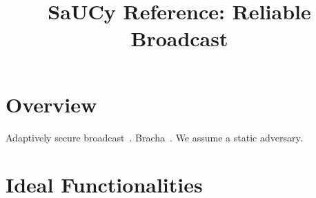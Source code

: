 \documentclass{llncs}
\title{SaUCy Reference: Reliable Broadcast}
\author{}
\institute{}
\begin{document}
\maketitle

\section{Overview}

Adaptively secure
broadcast~\cite{garay2011adaptively}. Bracha~\cite{bracha1987asynchronous}. We
assume a static adversary.

\section{Ideal Functionalities}

\begin{comment}
\begin{boxdef}{Functionality}{$\Func{BC}$}
  $\Func{BC}$ interacts with an adversary $\mc{S}$ and a set $\mc{P} = \{
  P_1, \ldots, P_n \}$ of parties.
  \begin{enumerate}
    \item Upon receiving $({\sf Bcast}, sid, m)$ from $P_i$, send $({\sf Bcast},
  sid, P_i, m)$ to all parties in $\mc{P}$ and to $\mc{S}$.
  \end{enumerate}
\end{boxdef}


\begin{boxdef}{Functionality}{$\Func{RBC}$}
  $\Func{RBC}$ interacts with an adversary $\mc{S}$ and a set $\mc{P} = \{
  P_1, \ldots, P_n \}$ of parties.
  \begin{enumerate}
    \item Upon receiving $({\sf Bcast}, sid, m)$ from $P_i$, leak $({\sf Bcast},
  sid, P_i, m)$ to $\mc{S}$.
  
    \item Upon receiving $m'$ from $\mc{S}$, do:
    
    \begin{itemize}
      \item If $P_i$ is corrupted, send $({\sf Bcast}, sid, P_i, m')$ to all
  parties in $\mc{P}$.
  
      \item If $P_i$ is not corrupted, send $({\sf Bcast}, sid, P_i, m)$ to all
  parties in $\mc{P}$.
    \end{itemize}
  \end{enumerate}
\end{boxdef}
\end{comment}
\end{document}
